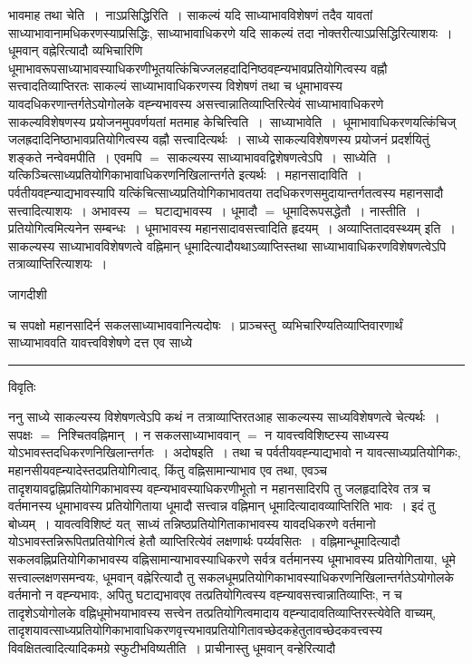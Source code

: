 \documentclass[10pt, openany]{book}
\begin{document}
{भावमाह {\la तथा चेति~।}~नाऽप्रसिद्धिरिति~। साकल्यं यदि साध्याभावविशेषणं तदैव यावतां साध्याभावानामधिकरणस्याप्रसिद्धिः, साध्याभावाधिकरणे यदि साकल्यं तदा नोक्तरीत्याऽप्रसिद्धिरित्याशयः~। धूमवान् वह्नेरित्यादौ व्यभिचारिणि धूमाभावरूपसाध्याभावस्याधिकरणीभूतयत्किंचिज्जलहदादिनिष्ठवह्न्यभावप्रतियोगित्वस्य वह्नौ सत्त्वादतिव्याप्तिरतः साकल्यं साध्याभावाधिकरणस्य विशेषणं तथा च धूमाभावस्य यावदधिकरणान्तर्गतेऽयोगोलके वह्न्यभावस्य असत्त्वान्नातिव्याप्तिरित्येवं साध्याभावाधिकरणे साकल्यविशेषणस्य प्रयोजनमुपवर्णयतां मतमाह \textendash केचित्त्विति~।~{\la साध्याभावेति~।}~धूमाभावाधिकरणयत्किंचिज्
जलह्रदादिनिष्ठाभावप्रतियोगित्वस्य वह्नौ सत्त्वादित्यर्थः~। साध्ये साकल्यविशेषणस्य प्रयोजनं प्रदर्शयितुं शङ्कते नन्वेवमपीति~। एवमपि $=$ साकल्यस्य
साध्याभाववद्विशेषणत्वेऽपि~।~{\la साध्येति~।} यत्किञ्चित्साध्यप्रतियोगिकाभावाधिकरणनिखिलान्तर्गते इत्यर्थः~। महानसादाविति~। पर्वतीयवह्न्याद्यभावस्यापि
यत्किंचित्साध्यप्रतियोगिकाभावतया तदधिकरणसमुदायान्तर्गतत्वस्य महानसादौ सत्त्वादित्याशयः~। अभावस्य $=$ घटाद्यभावस्य~। धूमादौ $=$ धूमादिरूपसद्धेतौ~। नास्तीति~।
प्रतियोगित्वमित्यनेन सम्बन्धः~। धूमाभावस्य महानसादावसत्त्वादिति हृदयम्~। अव्याप्तितादवस्थ्यम् इति~। साकल्यस्य साध्याभावविशेषणत्वे वह्निमान्
धूमादित्यादौयथाऽव्याप्तिस्तथा साध्याभावाधिकरणविशेषणत्वेऽपि तत्राव्याप्तिरित्याशयः~।
\newpage
\begin{center} जागदीशी \end{center}
{\la च सपक्षो महानसादिर्न सकलसाध्याभाववानित्यदोषः~। प्राञ्चस्तु\textemdash\ व्यभिचारिण्यतिव्याप्तिवारणार्थं साध्याभाववति यावत्त्वविशेषणे दत्त एव साध्ये}\\
\hrule
\begin{center}     विवृतिः \end{center}
ननु साध्ये साकल्यस्य विशेषणत्वेऽपि कथं न तत्राव्याप्तिरतआह साकल्यस्य साध्यविशेषणत्वे चेत्यर्थः~। सपक्षः $=$ निश्चितवह्निमान्~। न सकलसाध्याभाववान् $=$ न यावत्त्वविशिष्टस्य साध्यस्य योऽभावस्तदधिकरणनिखिलान्तर्गतः~। अदोषइति~। तथा च पर्वतीयवह्न्याद्यभावो न यावत्साध्यप्रतियोगिकः,
महानसीयवह्न्यादेस्तदप्रतियोगित्वाद्, किंतु वह्निसामान्याभाव एव तथा, एवञ्च तादृशयावद्वह्निप्रतियोगिकाभावस्य वह्न्यभावस्याधिकरणीभूतो न महानसादिरपि तु जलहृदादिरेव तत्र च वर्तमानस्य धूमाभावस्य प्रतियोगिताया धूमादौ सत्त्वान्न वह्निमान् धूमादित्यादावव्याप्तिरिति भावः~। इदं तु बोध्यम्~। यावत्वविशिष्टं यत्\textemdash\ साध्यं तन्निष्ठप्रतियोगिताकाभावस्य यावदधिकरणे वर्तमानो योऽभावस्तन्निरूपितप्रतियोगित्वं हेतौ व्याप्तिरित्येवं लक्षणार्थः पर्य्यवसितः~। वह्निमान्धूमादित्यादौ सकलवह्निप्रतियोगिकाभावस्य वह्निसामान्याभावस्याधिकरणे सर्वत्र वर्तमानस्य धूमाभावस्य प्रतियोगिताया, धूमे सत्त्वाल्लक्षणसमन्वयः, धूमवान् वह्नेरित्यादौ तु सकलधूमप्रतियोगिकाभावस्याधिकरणनिखिलान्तर्गतेऽयोगोलके वर्तमानो न वह्न्यभावः, अपितु घटाद्यभावएव तत्प्रतियोगित्वस्य वह्न्यावसत्त्वान्नातिव्याप्तिः, न च तादृशेऽयोगोलके वह्निधूमोभयाभावस्य सत्त्वेन तत्प्रतियोगित्वमादाय वह्न्यादावतिव्याप्तिरस्त्येवेति वाच्यम्, तादृशयावत्साध्यप्रतियोगिकाभावाधिकरणवृत्त्यभावप्रतियोगितावच्छेदकहेतुतावच्छेदकवत्त्वस्य विवक्षितत्वादित्यादिकमग्रे स्फुटीभविष्यतीति~। प्राचीनास्तु धूमवान् वन्हेरित्यादौ 
}
\end{document}
